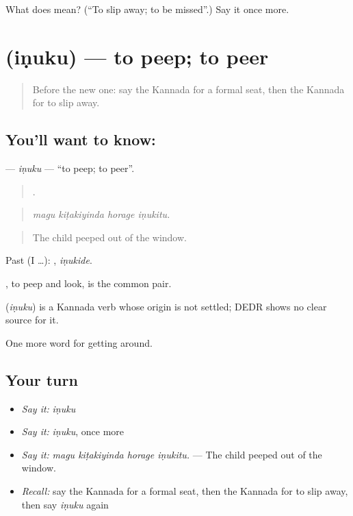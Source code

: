 \begin{tcolorbox}[breakable,colback=teal!4,colframe=teal!35!black,title={Before you move on}]
What does  mean? (\textquotedblleft{}To slip away; to be missed\textquotedblright{}.) Say it once more.
\end{tcolorbox}
\section[\texorpdfstring{\kn{ಇಣುಕು} (iṇuku)}{ಇಣುಕು (iṇuku)}]{ (iṇuku) — to peep; to peer}

\label{lesson:KA-C435-inuku}



\begin{quote}
Before the new one: say the Kannada for a formal seat, then the Kannada for to slip away.
\end{quote}

\subsection*{You'll want to know: }
\textbf{} — \emph{iṇuku} — \textquotedblleft{}to peep; to peer\textquotedblright{}.

\begin{quote}
   .
\end{quote}

\begin{quote}
\emph{magu kiṭakiyinda horage iṇukitu.}
\end{quote}

\begin{quote}
The child peeped out of the window.
\end{quote}

Past (I …): , \emph{iṇukide}.

 , to peep and look, is the common pair.

\begin{cousinweb}
\textbf{} (\emph{iṇuku}) is a Kannada verb whose origin is not settled; DEDR shows no clear source for it.
\end{cousinweb}

\begin{grammarlens}[title={What you've built}]
One more word for getting around.
\end{grammarlens}

\subsection*{Your turn}
\begin{itemize}
\raggedright
  \item \emph{Say it:} \emph{iṇuku}
  \item \emph{Say it:} \emph{iṇuku}, once more
  \item \emph{Say it:} \emph{magu kiṭakiyinda horage iṇukitu.} — The child peeped out of the window.
  \item \emph{Recall:} say the Kannada for a formal seat, then the Kannada for to slip away, then say \emph{iṇuku} again
\end{itemize}

